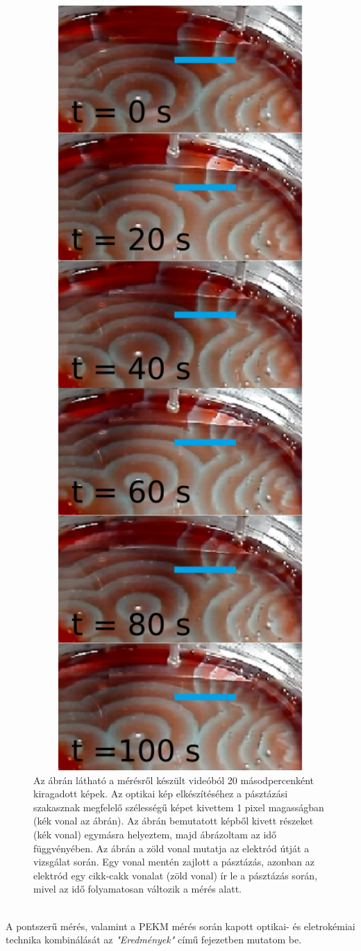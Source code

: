 \begin{figure}[p]
\centering
\includegraphics[width=1\textwidth]{img/pasztazas.png}
\caption{Az ábrán látható a mérésről készült videóból 20 másodpercenként kiragadott képek. Az optikai kép elkészítéséhez a pásztázási szakasznak megfelelő szélességű képet kivettem 1 pixel magasságban (kék vonal az ábrán). Az ábrán bemutatott képből kivett részeket (kék vonal) egymásra helyeztem, majd ábrázoltam az idő függvényében. Az ábrán a zöld vonal mutatja az elektród útját a vizsgálat során. Egy vonal mentén zajlott a pásztázás, azonban az elektród egy cikk-cakk vonalat (zöld vonal) ír le a pásztázás során, mivel az idő folyamatosan változik a mérés alatt.}
\label{fig:pasztazas}
\end{figure}
\\A pontszerű mérés, valamint a PEKM mérés során kapott optikai- és eletrokémiai technika kombinálását az \emph{"Eredmények"} című fejezetben mutatom be.
